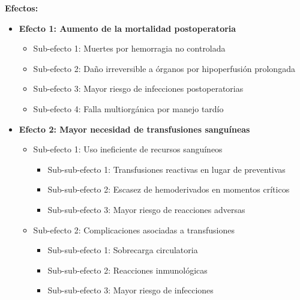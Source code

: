 \documentclass[12pt, letterpaper]{article}
\begin{document}
\vspace{0.5cm}
\textbf{Efectos:}

\begin{itemize}
    \item \textbf{Efecto 1: Aumento de la mortalidad postoperatoria}
    \begin{itemize}
        \item Sub-efecto 1: Muertes por hemorragia no controlada
        \item Sub-efecto 2: Daño irreversible a órganos por hipoperfusión prolongada
        \item Sub-efecto 3: Mayor riesgo de infecciones postoperatorias
        \item Sub-efecto 4: Falla multiorgánica por manejo tardío
    \end{itemize}
    
    \item \textbf{Efecto 2: Mayor necesidad de transfusiones sanguíneas}
    \begin{itemize}
        \item Sub-efecto 1: Uso ineficiente de recursos sanguíneos
        \begin{itemize}
            \item Sub-sub-efecto 1: Transfusiones reactivas en lugar de preventivas
            \item Sub-sub-efecto 2: Escasez de hemoderivados en momentos críticos
            \item Sub-sub-efecto 3: Mayor riesgo de reacciones adversas
        \end{itemize}
        \item Sub-efecto 2: Complicaciones asociadas a transfusiones
        \begin{itemize}
            \item Sub-sub-efecto 1: Sobrecarga circulatoria
            \item Sub-sub-efecto 2: Reacciones inmunológicas
            \item Sub-sub-efecto 3: Mayor riesgo de infecciones
        \end{itemize}
    \end{itemize}
    

\end{itemize}
\end{document}
